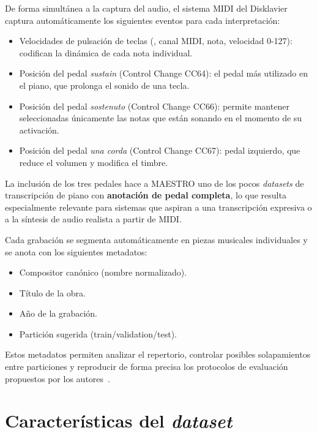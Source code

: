 \documentclass[11pt,spanish,listoffigures,listoftables]{tfgetsinf}
\begin{document}
De forma simultánea a la captura del audio, el sistema MIDI del Disklavier captura automáticamente los siguientes eventos para cada interpretación:
\begin{itemize}
\item Velocidades de pulsación de teclas (, canal MIDI, nota, velocidad 0-127): codifican la dinámica de cada nota individual.
\item Posición del pedal \textit{sustain} (Control Change CC64): el pedal más utilizado en el piano, que prolonga el sonido de una tecla.
\item Posición del pedal \textit{sostenuto} (Control Change CC66): permite mantener seleccionadas únicamente las notas que están sonando en el momento de su activación.
\item Posición del pedal \textit{una corda} (Control Change CC67): pedal izquierdo, que reduce el volumen y modifica el timbre.
\end{itemize}

La inclusión de los tres pedales hace a MAESTRO uno de los pocos \textit{datasets} de transcripción de piano con \textbf{anotación de pedal completa}, lo que resulta
especialmente relevante para sistemas que aspiran a una transcripción expresiva o a la síntesis de audio realista a partir de MIDI.

Cada grabación se segmenta automáticamente en piezas musicales individuales y se anota con los siguientes metadatos:
\begin{itemize}
\item  Compositor canónico (nombre normalizado).
\item Título de la obra.
\item Año de la grabación.
\item Partición sugerida (train/validation/test).
\end{itemize}

Estos metadatos permiten analizar el repertorio, controlar posibles solapamientos entre particiones y reproducir de forma precisa los protocolos de evaluación propuestos por los autores~\cite{magenta2020maestrov3}.
\section{Características del \textit{dataset}}
\label{sec:maestro_caracteristicas}
\end{document}
